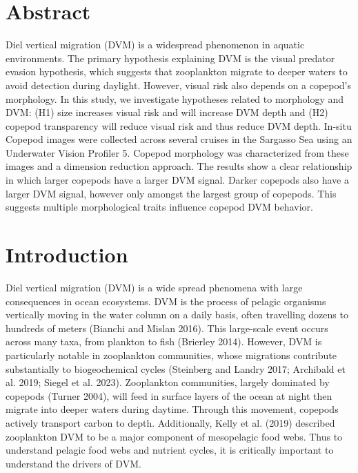 \documentclass[
]{article}
\begin{document}
\hypertarget{abstract}{%
\section{Abstract}\label{abstract}}

Diel vertical migration (DVM) is a widespread phenomenon in aquatic
environments. The primary hypothesis explaining DVM is the visual
predator evasion hypothesis, which suggests that zooplankton migrate to
deeper waters to avoid detection during daylight. However, visual risk
also depends on a copepod's morphology. In this study, we investigate
hypotheses related to morphology and DVM: (H1) size increases visual
risk and will increase DVM depth and (H2) copepod transparency will
reduce visual risk and thus reduce DVM depth. In-situ Copepod images
were collected across several cruises in the Sargasso Sea using an
Underwater Vision Profiler 5. Copepod morphology was characterized from
these images and a dimension reduction approach. The results show a
clear relationship in which larger copepods have a larger DVM signal.
Darker copepods also have a larger DVM signal, however only amongst the
largest group of copepods. This suggests multiple morphological traits
influence copepod DVM behavior.

\hypertarget{introduction}{%
\section{Introduction}\label{introduction}}

Diel vertical migration (DVM) is a wide spread phenomena with large
consequences in ocean ecosystems. DVM is the process of pelagic
organisms vertically moving in the water column on a daily basis, often
travelling dozens to hundreds of meters (Bianchi and Mislan 2016). This
large-scale event occurs across many taxa, from plankton to fish
(Brierley 2014). However, DVM is particularly notable in zooplankton
communities, whose migrations contribute substantially to biogeochemical
cycles (Steinberg and Landry 2017; Archibald et al. 2019; Siegel et al.
2023). Zooplankton communities, largely dominated by copepods (Turner
2004), will feed in surface layers of the ocean at night then migrate
into deeper waters during daytime. Through this movement, copepods
actively transport carbon to depth. Additionally, Kelly et al. (2019)
described zooplankton DVM to be a major component of mesopelagic food
webs. Thus to understand pelagic food webs and nutrient cycles, it is
critically important to understand the drivers of DVM.
\end{document}
